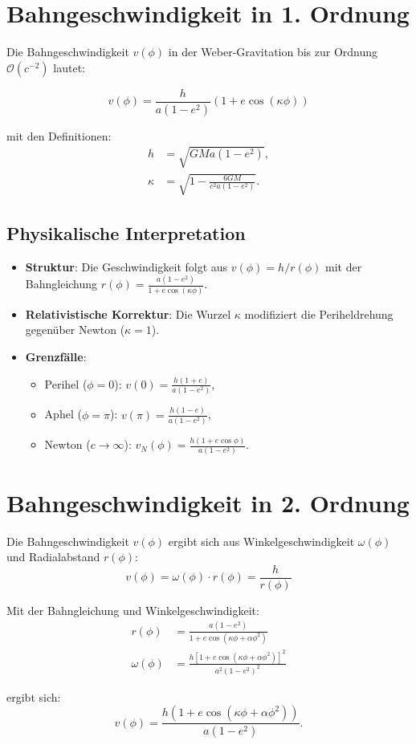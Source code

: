 \newpage
\section{Bahngeschwindigkeit in 1. Ordnung}
Die Bahngeschwindigkeit \(v(\phi)\) in der Weber-Gravitation bis zur Ordnung \(\mathcal{O}(c^{-2})\) lautet:

\begin{equation}
v(\phi) = \frac{h}{a(1 - e^2)} \left(1 + e \cos\left(\kappa\phi\right)\right)
\end{equation}

\noindent mit den Definitionen:
\begin{align*}
h &= \sqrt{GMa(1 - e^2)}, \\
\kappa &= \sqrt{1 - \frac{6GM}{c^2a(1 - e^2)}}.
\end{align*}

\subsection*{Physikalische Interpretation}
\begin{itemize}
    \item \textbf{Struktur}: Die Geschwindigkeit folgt aus \(v(\phi) = h/r(\phi)\) mit der Bahngleichung \(r(\phi) = \frac{a(1 - e^2)}{1 + e \cos(\kappa\phi)}\).
    \item \textbf{Relativistische Korrektur}: Die Wurzel \(\kappa\) modifiziert die Periheldrehung gegenüber Newton (\(\kappa = 1\)).
    \item \textbf{Grenzfälle}:
        \begin{itemize}
            \item Perihel (\(\phi = 0\)): \(v(0) = \frac{h(1 + e)}{a(1 - e^2)}\),
            \item Aphel (\(\phi = \pi\)): \(v(\pi) = \frac{h(1 - e)}{a(1 - e^2)}\),
            \item Newton (\(c \to \infty\)): \(v_N(\phi) = \frac{h(1 + e \cos\phi)}{a(1 - e^2)}\).
        \end{itemize}
\end{itemize}

\section{Bahngeschwindigkeit in 2. Ordnung}
Die Bahngeschwindigkeit $v(\phi)$ ergibt sich aus Winkelgeschwindigkeit $\omega(\phi)$ und Radialabstand $r(\phi)$:
\begin{equation}
v(\phi) = \omega(\phi) \cdot r(\phi) = \frac{h}{r(\phi)}
\end{equation}

Mit der Bahngleichung und Winkelgeschwindigkeit:
\begin{align}
r(\phi) &= \frac{a(1-e^2)}{1 + e\cos\left(\kappa\phi + \alpha\phi^2\right)}\\
\omega(\phi) &= \frac{h[1 + e\cos(\kappa\phi + \alpha\phi^2)]^2}{a^2(1-e^2)^2}
\end{align}

ergibt sich:
\begin{equation}
v(\phi) = \frac{h \left(1 + e\cos(\kappa\phi + \alpha\phi^2)\right)}{a(1 - e^2)}.
\end{equation}
